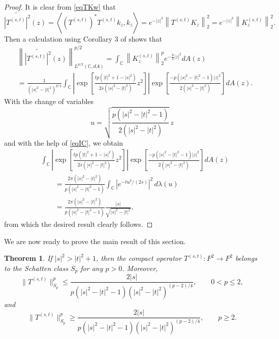 \documentclass[reqno]{amsart}
\newtheorem{theorem}{Theorem}%
\newcommand{\C}{{\mathbb C}}
\newcommand{\inc}{\int_{\C}}
\begin{document}
\begin{proof}
It is clear from \eqref{eqTKw} that
$$\widetilde{\left|T^{(s,t)}\right|^2}(z)=\left \langle\left(T^{(s,t)}
\right)^*T^{(s,t)}k_z,k_z\right\rangle=e^{-|z|^2}\left\|T^{(s,t)}K_z
\right\|_2^2=e^{-|z|^2}\left\|K_z^{(s,t)}\right\|_2^2.$$
Then a calculation using Corollary 3 of \cite{DZ3} shows that
\begin{align*}
&\left\|\widetilde{\left|T^{(s,t)}\right|^2}(z)\right\|_{L^{{p}/{2}}
(\mathbb{C},dA)}^{{p}/{2}}
=\inc \left\|K_z^{(s,t)} \right\|_2^p e^{-\frac{p}{2}|z|^2}dA(z)\\[8pt]
&=\frac{1}{(|s|^2-|t|^2)^{p/4}}\inc\left|\exp\left[\frac{tp(|t|^2+1-|s|^2)}
{2\overline{s}(|s|^2-|t|^2)}{z^2}\right]\right|\!\exp
\left[\frac{-p(|s|^2-|t|^2-1)|z|^2}{2(|s|^2-|t|^2)}\right]dA(z).
\end{align*}
With the change of variables
$$u=\sqrt{\frac{p(|s|^2-|t|^2-1)}{2(|s|^2-|t|^2)}}\,z$$
and with the help of \eqref{eqIC}, we obtain
\begin{align*}
&\inc
\left|\exp\left[\frac{tp(|t|^2+1-|s|^2)}{2\overline{s}(|s|^2-|t|^2)}{z^2}
\right]\right| \! \exp \left[\frac{-p(|s|^2-|t|^2-1)|z|^2}{2(|s|^2-|t|^2)}\right]dA(z)\\[8pt]
&\qquad=\frac{2\pi(|s|^2-|t|^2)}{p(|s|^2-|t|^2-1)}
\inc\left|e^{-tu^2/(2\overline s)}\right|^2\,d\lambda(u)\\[8pt]
&\qquad=\frac{2\pi(|s|^2-|t|^2)}{p(|s|^2-|t|^2-1)}\frac{|s|}{\sqrt{|s|^2-|t|^2}},
\end{align*}
from which the desired result clearly follows.
\end{proof}

We are now ready to prove the main result of this section.

\begin{theorem}\label{thmSp}
If $|s|^2>|t|^2+1$, then the compact operator $T^{(s,t)}: F^2\to F^2$
belongs to the Schatten class $S_p$ for any $p>0$. Moreover,
$$\|T^{(s,t)}\|_{S_p}^p\le\frac{2|s|}{p(|s|^2-|t|^2-1)
(|s|^2-|t|^2)^{(p-2)/4}},\qquad 0< p\leq2,$$
and
$$\|T^{(s,t)}\|_{S_p}^p\ge\frac{2|s|}{p(|s|^2-|t|^2-1)
(|s|^2-|t|^2)^{(p-2)/4}},\qquad p\geq2.$$
\end{theorem}
\end{document}
